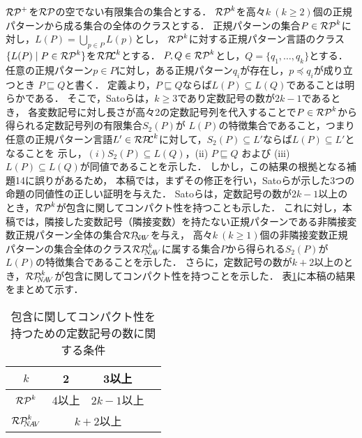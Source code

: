 $\mathcal{RP}^{+}$を$\mathcal{RP}$の空でない有限集合の集合とする．
$\mathcal{RP}^{k}$を高々$k~(k\geq 2)$個の正規パターンから成る集合の全体のクラスとする．
正規パターンの集合$P\in\mathcal{RP}^{k}$に対し，$L(P)=\bigcup_{p\in P}L(p)$とし，
$\mathcal{RP}^{k}$に対する正規パターン言語のクラス$\{L(P) \mid P\in \mathcal{RP}^{k}\}$を$\mathcal{RP\!\!L}^{k}$とする．
$P,Q\in \mathcal{RP}^{k}$とし，$Q= \{ q_{1}, \ldots, q_{k} \}$とする．
任意の正規パターン$p\in P$に対し，ある正規パターン$q_{i}$が存在し，$p\preceq q_{i}$が成り立つとき
$P\sqsubseteq Q$と書く．
定義より，$P \sqsubseteq Q$ならば$L(P)\subseteq L(Q)$であることは明らかである．
そこで，Satoら\cite{Sato1}は，$k \ge 3$であり定数記号の数が$2k-1$であるとき，
各変数記号に対し長さが高々2の定数記号列を代入することで$P\in \mathcal{RP}^{k}$から得られる定数記号列の有限集合$S_2(P)$が
$L(P)$の特徴集合であること，つまり任意の正規パターン言語$L'\in \mathcal{RP\!\!L}^{k}$に対して，$S_2(P) \subseteq L'$ならば$L(P)\subseteq L'$となることを
示し，$(i) S_2(P) \subseteq L(Q)$，(ii) $P\sqsubseteq Q$ および (iii) $L(P)\subseteq L(Q)$が同値であることを示した．
しかし，この結果の根拠となる補題14\cite{Sato1}に誤りがあるため，
本稿では，まずその修正を行い，Satoらが示した3つの命題の同値性の正しい証明を与えた．
Satoら\cite{Sato1}は，定数記号の数が$2k-1$以上のとき，$\mathcal{RP}^{k}$が包含に関してコンパクト性を持つことも示した．
これに対し，本稿では，隣接した変数記号（隣接変数）を持たない正規パターンである非隣接変数正規パターン全体の集合$\mathcal{RP}_{\!\!\!N\!\!A\!V}$を与え，
高々$k~(k\ge 1)$個の非隣接変数正規パターンの集合全体のクラス$\mathcal{RP}^{k}_{\!\!\!N\!A\!V}$に属する集合$P$から得られる$S_2(P)$が$L(P)$の特徴集合であることを示した．
さらに，定数記号の数が$k+2$以上のとき，$\mathcal{RP}^{k}_{\!\!\!N\!A\!V}$が包含に関してコンパクト性を持つことを示した．
表\ref{表1}に本稿の結果をまとめて示す．
\begin{table}
\begin{center}
\vspace{-0.4cm}
\caption{包含に関してコンパクト性を持つための定数記号の数に関する条件}
\label{表1}
\begin{tabular}{llll}
\hline
\multicolumn{1}{|c|}{$k$}   & \multicolumn{1}{c|}{2}                            & \multicolumn{1}{c|}{3以上} \\ 
\hline
\hline
\multicolumn{1}{|c|}{$\mathcal{RP}^{k}$} & \multicolumn{1}{c|}{4以上}                          & \multicolumn{1}{c|}{$2k-1$以上} \\ \hline
\multicolumn{1}{|c|}{$\mathcal{RP}^{k}_{\!\!\!N\!A\!V}$} & \multicolumn{2}{c|}{$k+2$以上} \\ \hline
\end{tabular}
\end{center}
\end{table}

